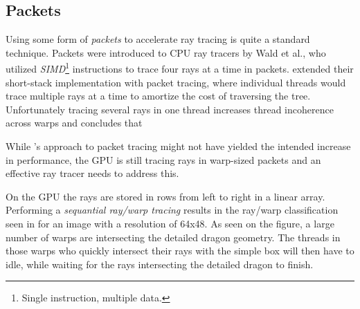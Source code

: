 \subsection{Packets}


Using some form of \textit{packets} to accelerate ray tracing is quite a
standard technique. Packets were introduced to CPU ray tracers by Wald et
al., who utilized \textit{SIMD}\footnote{Single
  instruction, multiple data.} instructions to trace four rays at a time in
packets. \horn{} extended their short-stack implementation with packet tracing,
where individual threads would trace multiple rays at a time to amortize the
cost of traversing the tree. Unfortunately tracing several rays in one thread
increases thread incoherence across warps and \aila{} concludes that




While \horn's approach to packet tracing might not have yielded the intended
increase in performance, the GPU is still tracing rays in warp-sized packets and
an effective ray tracer needs to address this.

On the GPU the rays are stored in rows from left to right in a linear
array. Performing a \textit{sequantial ray/warp tracing} results in the ray/warp
classification seen in  for an image with a
resolution of 64x48. As seen on the figure, a large number of warps are
intersecting the detailed dragon geometry. The threads in those warps who
quickly intersect their rays with the simple box will then have to idle, while
waiting for the rays intersecting the detailed dragon to finish.

